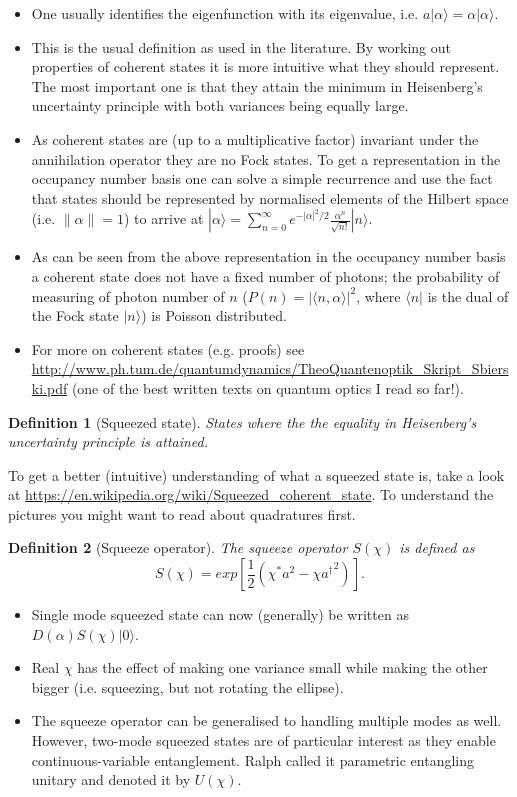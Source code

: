 \documentclass[11pt]{report}
\newtheorem{definition}{Definition}[chapter]
\begin{document}
\begin{itemize}
	\item One usually identifies the eigenfunction with its eigenvalue, i.e. $a|\alpha\rangle = \alpha|\alpha\rangle$.
	\item This is the usual definition as used in the literature. By working out properties of coherent states it is more intuitive what they should represent. The most important one is that they attain the minimum in Heisenberg's uncertainty principle with both variances being equally large.
	\item As coherent states are (up to a multiplicative factor) invariant under the annihilation operator they are no Fock states. To get a representation in the occupancy number basis one can solve a simple recurrence and use the fact that states should be represented by normalised elements of the Hilbert space (i.e. $\|\alpha\|=1$) to arrive at $|\alpha\rangle = \sum_{n=0}^\infty e^{-|\alpha|^2/2}\frac{\alpha^n}{\sqrt{n!}}|n\rangle$.
	\item As can be seen from the above representation in the occupancy number basis a coherent state does not have a fixed number of photons; the probability of measuring of photon number of $n$ ($P(n) = |\langle n, \alpha\rangle|^2$, where $\langle n|$ is the dual of the Fock state $|n\rangle$) is Poisson distributed.
	\item For more on coherent states (e.g. proofs) see \url{http://www.ph.tum.de/quantumdynamics/TheoQuantenoptik_Skript_Sbierski.pdf} (one of the best written texts on quantum optics I read so far!).
\end{itemize}

\begin{definition}[Squeezed state]
	States where the the equality in Heisenberg's uncertainty principle is attained.
\end{definition}

To get a better (intuitive) understanding of what a squeezed state is, take a look at \url{https://en.wikipedia.org/wiki/Squeezed_coherent_state}. To understand the pictures you might want to read about quadratures first.

\begin{definition}[Squeeze operator]
	The squeeze operator $S(\chi)$ is defined as $$S(\chi) = exp[\frac{1}{2}(\chi^*a^2 - \chi {a^\dagger}^2)].$$
\end{definition}

\begin{itemize}
	\item Single mode squeezed state can now (generally) be written as $D(\alpha)S(\chi)|0\rangle$.
	\item Real $\chi$ has the effect of making one variance small while making the other bigger (i.e. squeezing, but not rotating the ellipse).
	\item The squeeze operator can be generalised to handling multiple modes as well. However, two-mode squeezed states are of particular interest as they enable continuous-variable entanglement. Ralph called it parametric entangling unitary and denoted it by $U(\chi)$.
\end{itemize}
\end{document}
